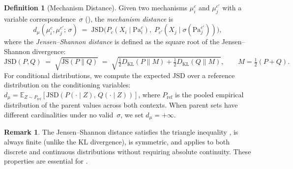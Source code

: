 \documentclass[11pt,a4paper]{article}
\theoremstyle{definition}
\newtheorem{definition}[theorem]{Definition}
\newtheorem{remark}[theorem]{Remark}
\newcommand{\Pa}{\mathrm{Pa}}                 %
\newcommand{\JSD}{\mathrm{JSD}}               %
\newcommand{\JS}{\mathrm{JS}}                 %
\newcommand{\KL}{D_{\mathrm{KL}}}             %
\newcommand{\dmu}{d_{\mu}}                    %
\begin{document}
\begin{definition}[Mechanism Distance]\label{def:mechanism-distance}
Given two mechanisms $\mu_i^c$ and $\mu_j^{c'}$ with a variable
correspondence~$\sigma$ (), the \emph{mechanism
distance} is
\[
  \dmu(\mu_i^c, \mu_j^{c'};\, \sigma)
  \;=\;
  \JSD\!\bigl(P_c(X_i \mid \Pa_i^c),\;
              P_{c'}(X_j \mid \sigma(\Pa_j^{c'}))\bigr),
\]
where the \emph{Jensen--Shannon distance} is defined as the square root of
the Jensen--Shannon divergence:
\[
  \JSD(P, Q)
  \;=\;
  \sqrt{\JS(P \| Q)}
  \;=\;
  \sqrt{\tfrac{1}{2}\KL(P \| M) + \tfrac{1}{2}\KL(Q \| M)},
  \qquad
  M = \tfrac{1}{2}(P + Q).
\]
For conditional distributions, we compute the expected JSD over a
reference distribution on the conditioning variables:
$\dmu = \mathbb{E}_{Z \sim P_{\mathrm{ref}}}[\JSD(P(\cdot \mid Z),\, Q(\cdot \mid Z))]$,
where $P_{\mathrm{ref}}$ is the pooled empirical distribution of the
parent values across both contexts.  When parent sets have different
cardinalities under no valid~$\sigma$, we set $\dmu = +\infty$.
\end{definition}

\begin{remark}
The Jensen--Shannon distance satisfies the triangle inequality
\citep{endres2003new}, is always finite (unlike the KL divergence), is
symmetric, and applies to both discrete and continuous distributions
without requiring absolute continuity.  These properties are essential for
.
\end{remark}
\end{document}
